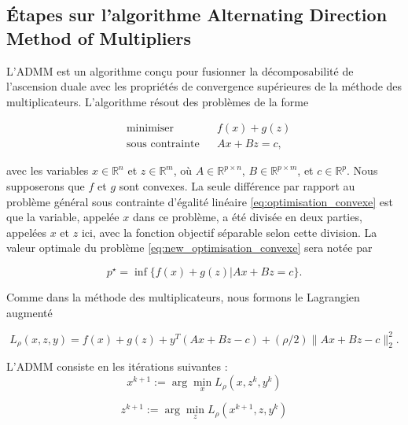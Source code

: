 \subsection{Étapes sur l'algorithme Alternating Direction Method of Multipliers}
L'ADMM est un algorithme conçu pour fusionner la décomposabilité de l'ascension duale avec les propriétés de convergence supérieures de la méthode des multiplicateurs. L'algorithme résout des problèmes de la forme


\begin{equation}
    \begin{aligned}
        & \text{minimiser} && f(x) + g(z)\\
        & \text{sous contrainte} && Ax + Bz = c,
    \end{aligned}
    \label{eq:new_optimisation_convexe}
\end{equation}

avec les variables \( x \in \mathbb{R}^n \) et \( z \in \mathbb{R}^m \), où \( A \in \mathbb{R}^{p \times n} \), \( B \in \mathbb{R}^{p \times m} \), et \( c \in \mathbb{R}^p \). Nous supposerons que \( f \) et \( g \) sont convexes. La seule différence par rapport au problème général sous contrainte d'égalité linéaire \eqref{eq:optimisation_convexe} est que la variable, appelée \( x \) dans ce problème, a été divisée en deux parties, appelées \( x \) et \( z \) ici, avec la fonction objectif séparable selon cette division. La valeur optimale du problème \eqref{eq:new_optimisation_convexe} sera notée par

\begin{equation}p^\star = \inf \{ f(x) + g(z) | Ax + Bz = c \}.\end{equation}

Comme dans la méthode des multiplicateurs, nous formons le Lagrangien augmenté

\begin{equation}L_\rho(x, z, y) = f(x) + g(z) + y^T(Ax + Bz - c) + (\rho/2) \|Ax + Bz - c\|_2^2.\end{equation}


L'ADMM consiste en les itérations suivantes :
\begin{equation}
    x^{k+1} := \arg\min_x L_\rho(x, z^k, y^k)
    \label{eq:x_update}
\end{equation}

\begin{equation}
    z^{k+1} := \arg\min_z L_\rho(x^{k+1}, z, y^k)
    \label{eq:z_update}
\end{equation}

